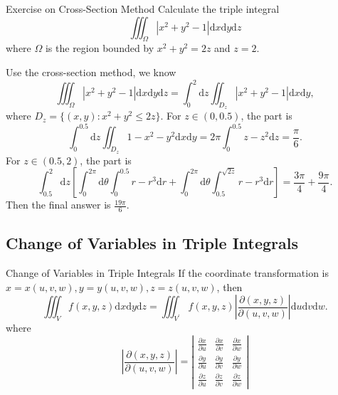 \begin{example}{Exercise on Cross-Section Method}{}
  Calculate the triple integral
  \begin{equation}
    \iiint_{\Omega} |x^2 + y^2 - 1|\mathrm{d} x \mathrm{d} y \mathrm{d} z
  \end{equation}
  where $\Omega$ is the region bounded by $x^2 + y^2 = 2z$ and $z = 2$.
\end{example}

\begin{solution}
  Use the cross-section method, we know
  \begin{equation}
    \iiint_{\Omega} |x^2 + y^2 - 1| \mathrm{d} x \mathrm{d} y \mathrm{d} z
    = \int_0^2 \mathrm{d} z \iint_{D_z} |x^2 + y^2 - 1|\mathrm{d} x \mathrm{d} y,
  \end{equation}
  where $D_z = \{(x, y): x^2 + y^2 \leq 2z\}$.
  For $z \in (0, 0.5)$, the part is
  \begin{equation}
    \int_0^{0.5} \mathrm{d} z \iint_{D_z} 1 - x^2 - y^2 \mathrm{d} x \mathrm{d} y
    = 2\pi \int_0^{0.5} z - z^2 \mathrm{d} z = \frac{\pi}{6}.
  \end{equation}
  For $z \in (0.5, 2)$, the part is
  \begin{equation}
    \int_{0.5}^2 \mathrm{d} z
    \left[
      \int_0^{2\pi} \mathrm{d} \theta \int_0^{0.5} r - r^3\mathrm{d} r
      + \int_0^{2\pi} \mathrm{d} \theta \int_{0.5}^{\sqrt{2z}} r - r^3\mathrm{d} r
    \right]= \frac{3\pi}{4} + \frac{9\pi}{4}.
  \end{equation}
  Then the final answer is $\frac{19\pi}{6}$.
\end{solution}

\subsection{Change of Variables in Triple Integrals}

\begin{proposition}{Change of Variables in Triple Integrals}{}
  If the coordinate transformation is $x = x(u,v,w), y=y(u,v,w), z=z(u,v,w)$,
  then
  \begin{equation}
     \iiint _V f(x,y,z) \mathrm{d}x\mathrm{d}y\mathrm{d}z = \iiint_{V^{\prime}}f(x,y,z)\left|\frac{\partial (x,y,z)}{\partial(u,v,w)}\right|\mathrm{d}u\mathrm{d}v\mathrm{d}w.
  \end{equation}
  where
  \begin{equation}
    \left|\frac{\partial(x,y,z)}{\partial(u,v,w)}\right| = \left|
      \begin{array}{ccc}
        \frac{\partial x}{\partial u}&\frac{\partial x}{\partial v}&\frac{\partial x}{\partial w}\\
        \frac{\partial y}{\partial u}&\frac{\partial y}{\partial v}&\frac{\partial y}{\partial w} \\
                                     \frac{\partial z}{\partial u}&\frac{\partial z}{\partial v}&\frac{\partial z}{\partial w}
      \end{array}
    \right|
  \end{equation}
\end{proposition}

